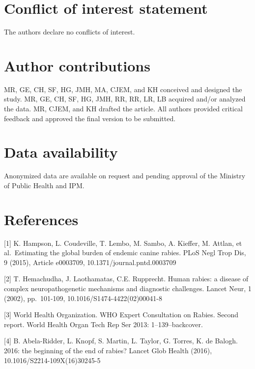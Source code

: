 \documentclass[
]{book}
\begin{document}
\hypertarget{conflict-of-interest-statement}{%
\section{Conflict of interest statement}\label{conflict-of-interest-statement}}

The authors declare no conflicts of interest.

\hypertarget{author-contributions}{%
\section{Author contributions}\label{author-contributions}}

MR, GE, CH, SF, HG, JMH, MA, CJEM, and KH conceived and designed the study. MR, GE, CH, SF, HG, JMH, RR, RR, LR, LB acquired and/or analyzed the data. MR, CJEM, and KH drafted the article. All authors provided critical feedback and approved the final version to be submitted.

\hypertarget{data-availability}{%
\section{Data availability}\label{data-availability}}

Anonymized data are available on request and pending approval of the Ministry of Public Health and IPM.

\hypertarget{references-1}{%
\section{References}\label{references-1}}

{[}1{]} K. Hampson, L. Coudeville, T. Lembo, M. Sambo, A. Kieffer, M. Attlan, et al.~Estimating the global burden of endemic canine rabies. PLoS Negl Trop Dis, 9 (2015), Article e0003709, 10.1371/journal.pntd.0003709

{[}2{]} T. Hemachudha, J. Laothamatas, C.E. Rupprecht. Human rabies: a disease of complex neuropathogenetic mechanisms and diagnostic challenges. Lancet Neur, 1 (2002), pp.~101-109, 10.1016/S1474-4422(02)00041-8

{[}3{]} World Health Organization. WHO Expert Consultation on Rabies. Second report. World Health Organ Tech Rep Ser 2013: 1--139--backcover.

{[}4{]} B. Abela-Ridder, L. Knopf, S. Martin, L. Taylor, G. Torres, K. de Balogh. 2016: the beginning of the end of rabies? Lancet Glob Health (2016), 10.1016/S2214-109X(16)30245-5
\end{document}
